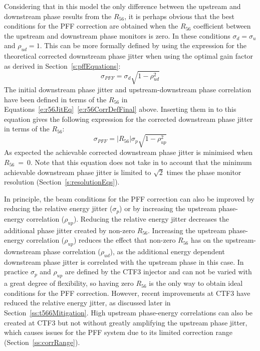Considering that in this model the only difference between the upstream and downstream phase results from the \(R_{56}\), it is perhaps obvious that the best conditions for the PFF correction are obtained when the \(R_{56}\) coefficient between the upstream and downstream phase monitors is zero. In these conditions \(\sigma_d = \sigma_u\) and \(\rho_{ud} = 1\). This can be more formally defined by using the expression for the theoretical corrected downstream phase jitter when using the optimal gain factor as derived in Section~\ref{s:pffEquations}:
\begin{equation}
\sigma_{PFF} = \sigma_d\sqrt{1-\rho_{ud}^2}
\end{equation}
The initial downstream phase jitter and upstream-downstream phase correlation have been defined in terms of the \(R_{56}\) in Equations~\ref{e:r56JitEq}~\ref{e:r56CorrDefFinal} above. Inserting them in to this equation gives the following expression for the corrected downstream phase jitter in terms of the \(R_{56}\):
\begin{equation}
\sigma_{PFF} = \left|R_{56}\right|\sigma_p\sqrt{1-\rho_{up}^2}
\label{e:r56PFFJit}
\end{equation}
As expected the achievable corrected downstream phase jitter is minimised when \(R_{56}~=~0\). Note that this equation does not take in to account that the minimum achievable downstream phase jitter is limited to \(\sqrt{2}\) times the phase monitor resolution (Section~\ref{s:resolutionEqs}).

In principle, the beam conditions for the PFF correction can also be improved by reducing the relative energy jitter (\(\sigma_p\)) or by increasing the upstream phase-energy correlation (\(\rho_{up}\)). Reducing the relative energy jitter decreases the additional phase jitter created by non-zero \(R_{56}\). Increasing the upstream phase-energy correlation (\(\rho_{up}\)) reduces the effect that non-zero \(R_{56}\) has on the upstream-downstream phase correlation (\(\rho_{ud}\)), as the additional energy dependent downstream phase jitter is correlated with the upstream phase in this case. 
In practice \(\sigma_p\) and \(\rho_{up}\) are defined by the CTF3 injector and can not be varied with a great degree of flexibility, so having zero \(R_{56}\) is the only way to obtain ideal conditions for the PFF correction. However, recent improvements at CTF3 have reduced the relative energy jitter, as discussed later in Section~\ref{ss:t566Mitigation}. High upstream phase-energy correlations can also be created at CTF3 but not without greatly amplifying the upstream phase jitter, which causes issues for the PFF system due to its limited correction range (Section~\ref{ss:corrRange}).


